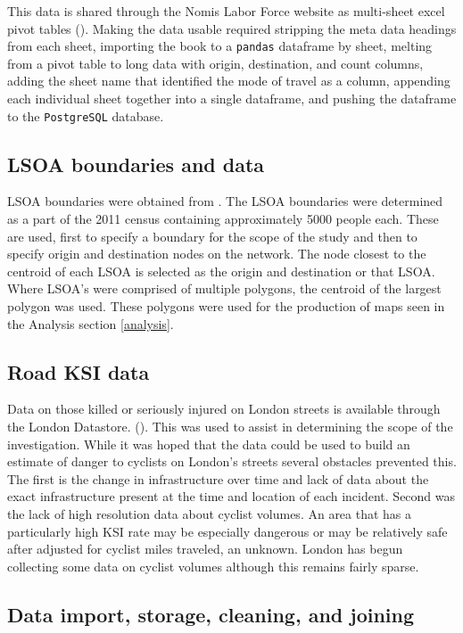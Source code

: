 This data is shared through the Nomis Labor Force website as multi-sheet excel pivot tables (\cite{nomis}). Making the data usable required stripping the meta data headings from each sheet, importing the book to a \texttt{pandas} dataframe by sheet, melting from a pivot table to long data with origin, destination, and count columns, adding the sheet name that identified the mode of travel as a column, appending each individual sheet together into a single dataframe, and pushing the dataframe to the \texttt{PostgreSQL} database. 

\subsection{LSOA boundaries and data}
	
LSOA boundaries were obtained from  \cite{lsoageoms}. The LSOA boundaries were determined as a part of the 2011 census containing approximately 5000 people each. These are used, first to specify a boundary for the scope of the study and then to specify origin and destination nodes on the network. The node closest to the centroid of each LSOA is selected as the origin and destination or that LSOA. Where LSOA's were comprised of multiple polygons, the centroid of the largest polygon was used. These polygons were used for the production of maps seen in the Analysis section \ref{analysis}. 
	
\subsection{Road KSI data}

Data on those killed or seriously injured on London streets is available through the London Datastore. (\cite{cyclistksi}). This was used to assist in determining the scope of the investigation. While it was hoped that the data could be used to build an estimate of danger to cyclists on London's streets several obstacles prevented this. The first is the change in infrastructure over time and lack of data about the exact infrastructure present at the time and location of each incident. Second was the lack of high resolution data about cyclist volumes. An area that has a particularly high KSI rate may be especially dangerous or may be relatively safe after adjusted for cyclist miles traveled, an unknown. London has begun collecting some data on cyclist volumes although this remains fairly sparse. 
	
\subsection{Data import, storage, cleaning, and joining}

